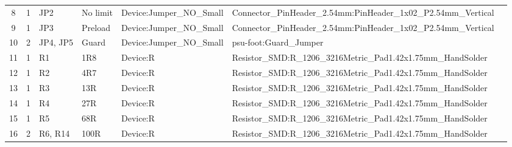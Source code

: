 \documentclass[letterpaper,twocolumn,10pt]{article}
\begin{document}
\begin{sidewaystable*}[ht]
{\begin{tabular}{cclllll}
      8                      & 1                                                        & JP2                    & No limit               & Device:Jumper\_NO\_Small         & Connector\_PinHeader\_2.54mm:PinHeader\_1x02\_P2.54mm\_Vertical                                         \\
      9                      & 1                                                        & JP3                    & Preload                & Device:Jumper\_NO\_Small         & Connector\_PinHeader\_2.54mm:PinHeader\_1x02\_P2.54mm\_Vertical                                         \\
      10                     & 2                                                        & JP4, JP5               & Guard                  & Device:Jumper\_NO\_Small         & psu-foot:Guard\_Jumper                                                                                  \\
      11                     & 1                                                        & R1                     & 1R8                    & Device:R                         & Resistor\_SMD:R\_1206\_3216Metric\_Pad1.42x1.75mm\_HandSolder                                           \\
      12                     & 1                                                        & R2                     & 4R7                    & Device:R                         & Resistor\_SMD:R\_1206\_3216Metric\_Pad1.42x1.75mm\_HandSolder                                           \\
      13                     & 1                                                        & R3                     & 13R                    & Device:R                         & Resistor\_SMD:R\_1206\_3216Metric\_Pad1.42x1.75mm\_HandSolder                                           \\
      14                     & 1                                                        & R4                     & 27R                    & Device:R                         & Resistor\_SMD:R\_1206\_3216Metric\_Pad1.42x1.75mm\_HandSolder                                           \\
      15                     & 1                                                        & R5                     & 68R                    & Device:R                         & Resistor\_SMD:R\_1206\_3216Metric\_Pad1.42x1.75mm\_HandSolder                                           \\
      16                     & 2                                                        & R6, R14                & 100R                   & Device:R                         & Resistor\_SMD:R\_1206\_3216Metric\_Pad1.42x1.75mm\_HandSolder                                           \\

\end{tabular}}
\end{sidewaystable*}
\end{document}

